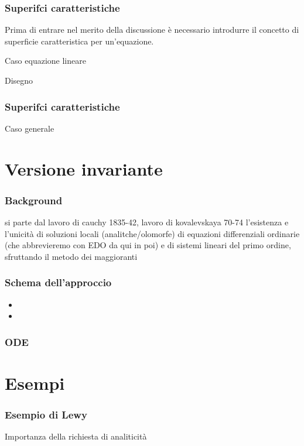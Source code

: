 \documentclass{beamer}
\begin{document}
\begin{frame}
\frametitle{Superifci caratteristiche}
Prima di entrare nel merito della discussione è necessario introdurre il concetto di superficie caratteristica per un'equazione.

Caso equazione lineare

Disegno
\end{frame}

\begin{frame}
\frametitle{Superifci caratteristiche}
Caso generale
\end{frame}




\section{Versione invariante}

\begin{frame}
\frametitle{Background}
si parte dal lavoro di cauchy 1835-42, lavoro di kovalevskaya 70-74
l'esistenza e l'unicità di soluzioni locali (analitche/olomorfe) di equazioni differenziali ordinarie (che abbrevieremo con EDO da qui in poi) e di sistemi lineari del primo ordine, sfruttando il metodo dei maggioranti
\end{frame}

\begin{frame}
\frametitle{Schema dell'approccio}
\begin{itemize}
\item 
\item 
\end{itemize}
\end{frame}


\begin{frame}
\frametitle{ODE}
\end{frame}




\section{Esempi}

\begin{frame}
\frametitle{Esempio di Lewy}
Importanza della richiesta di analiticità
\end{frame}
\end{document}
